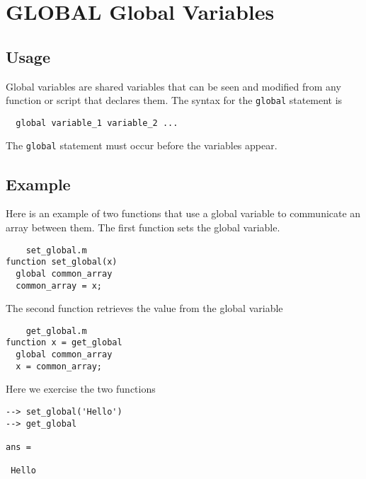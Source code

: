 \section{GLOBAL Global Variables}

\subsection{Usage}

Global variables are shared variables that can be
seen and modified from any function or script that 
declares them.  The syntax for the \verb|global| statement
is
\begin{verbatim}
  global variable_1 variable_2 ...
\end{verbatim}
The \verb|global| statement must occur before the variables
appear.
\subsection{Example}

Here is an example of two functions that use a global
variable to communicate an array between them.  The
first function sets the global variable.
\begin{verbatim}
    set_global.m
function set_global(x)
  global common_array
  common_array = x;
\end{verbatim}
The second function retrieves the value from the global
variable
\begin{verbatim}
    get_global.m
function x = get_global
  global common_array
  x = common_array;
\end{verbatim}
Here we exercise the two functions
\begin{verbatim}
--> set_global('Hello')
--> get_global

ans = 

 Hello
\end{verbatim}
